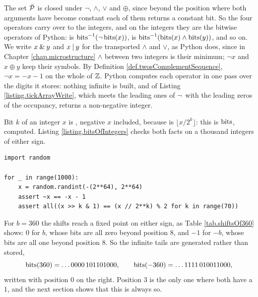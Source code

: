 The set $\bar{\mathcal{P}}$ is closed under $\neg$, $\wedge$, $\vee$ and $\oplus$,
since beyond the position where both arguments have become constant
each of them returns a constant bit.
So the four operators carry over to the integers,
and on the integers they are the bitwise operators of Python:
 is $\mathrm{bits}^{-1}(\neg\,\mathrm{bits}(x))$,
 is $\mathrm{bits}^{-1}(\mathrm{bits}(x) \wedge \mathrm{bits}(y))$,
and so on.
We write $x \mathbin{\&} y$ and $x \mathbin{|} y$ for the transported $\wedge$ and $\vee$, as Python does,
since in Chapter \ref{chap.microstructure} $\wedge$ between two integers is their minimum;
$\neg x$ and $x \oplus y$ keep their symbols.
By Definition \ref{def.twosComplementSequence}, $\neg x = -x - 1$ on the whole of $\mathbb{Z}$.
Python computes each operator in one pass over the digits it stores:
nothing infinite is built,
and 
of Listing \ref{listing.tickArrayWrite},
which meets the leading ones of $\neg\,$ with the leading zeros of the occupancy,
returns a non-negative integer.

Bit $k$ of an integer $x$ is , negative $x$ included,
because  is $\lfloor x / 2^k \rfloor$:
this is $\mathrm{bits}$, computed.
Listing \ref{listing.bitsOfIntegers} checks both facts on a thousand integers of either sign.

\begin{lstlisting}[caption={$\neg x = -x-1$, and the bits of an integer of either sign.}, label=listing.bitsOfIntegers]
import random

for _ in range(1000):
    x = random.randint(-(2**64), 2**64)
    assert ~x == -x - 1
    assert all((x >> k & 1) == (x // 2**k) % 2 for k in range(70))
\end{lstlisting}

For $b = 360$ the shifts reach a fixed point on either sign, as Table \ref{tab.shiftsOf360}
shows: $0$ for $b$, whose bits are all zero beyond position $8$,
and $-1$ for $-b$, whose bits are all one beyond position $8$.
So the infinite tails are generated rather than stored,
\begin{equation*}
 \mathrm{bits}(360) = \dots 0000\,101101000,
 \qquad
 \mathrm{bits}(-360) = \dots 1111\,010011000 ,
\end{equation*}
written with position $0$ on the right.
Position $3$ is the only one where both have a $1$,
and the next section shows that this is always so.

